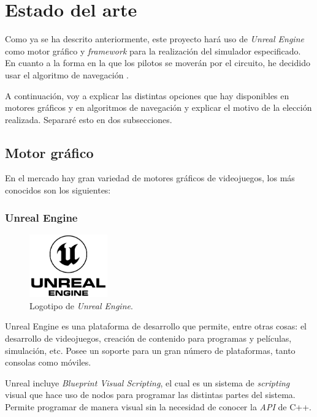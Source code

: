 \section{Estado del arte}
Como ya se ha descrito anteriormente, este proyecto hará uso de \textit{Unreal Engine} como motor gráfico y \textit{framework} para la realización del simulador especificado. En cuanto a la forma en la que los pilotos se moverán por el circuito, he decidido usar el algoritmo de navegación \finalAlg.

\bigskip

A continuación, voy a explicar las distintas opciones que hay disponibles en motores gráficos y en algoritmos de navegación y explicar el motivo de la elección realizada. Separaré esto en dos subsecciones.

\subsection{Motor gráfico}
En el mercado hay gran variedad de motores gráficos de videojuegos, los más conocidos son los siguientes:

\subsubsection{Unreal Engine}

\begin{figure}[H]
   \centering
   \includegraphics[width=0.3\textwidth]{imagenes/UE_LOGO.png}
   \caption{Logotipo de \textit{Unreal Engine}\cite{unreal-logo}.}
\end{figure}

Unreal Engine \cite{unreal} es una plataforma de desarrollo que permite, entre otras cosas: el desarrollo de videojuegos, creación de contenido para programas y películas, simulación, etc. Posee un soporte para un gran número de plataformas, tanto consolas como móviles.

\bigskip

Unreal incluye \textit{Blueprint Visual Scripting}, el cual es un sistema de \textit{scripting} visual que hace uso de nodos para programar las distintas partes del sistema. Permite programar de manera visual sin la necesidad de conocer la \textit{API} de C++.

